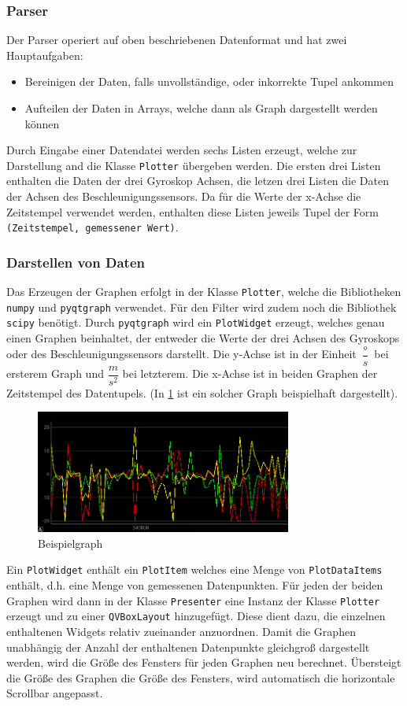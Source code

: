 \subsubsection{Parser}
Der Parser operiert auf oben beschriebenen Datenformat und hat zwei Hauptaufgaben:
\begin{itemize}
 \item Bereinigen der Daten, falls unvollständige, oder inkorrekte Tupel ankommen
 \item Aufteilen der Daten in Arrays, welche dann als Graph dargestellt werden können
\end{itemize}
Durch Eingabe einer Datendatei werden sechs Listen erzeugt, welche zur Darstellung and die Klasse \texttt{Plotter} übergeben werden. Die ersten drei Listen enthalten die Daten der drei Gyroskop Achsen, die letzen drei Listen die Daten der Achsen des Beschleunigungssensors. Da für die Werte der x-Achse die Zeitstempel verwendet werden, enthalten diese Listen jeweils Tupel der Form \texttt{(Zeitstempel, gemessener Wert)}.
\subsubsection{Darstellen von Daten}
Das Erzeugen der Graphen erfolgt in der Klasse \texttt{Plotter}, welche die Bibliotheken \texttt{numpy} und \texttt{pyqtgraph} verwendet. Für den Filter wird zudem noch die Bibliothek \texttt{scipy} benötigt. Durch \texttt{pyqtgraph} wird ein \texttt{PlotWidget} erzeugt, welches genau einen Graphen beinhaltet, der entweder die Werte der drei Achsen des Gyroskops oder des Beschleunigungssensors darstellt. Die y-Achse ist in der Einheit $\dfrac{\circ}{s}$ bei ersterem Graph und $\dfrac{m}{s^{2}}$ bei letzterem. Die x-Achse ist in beiden Graphen der Zeitstempel des Datentupels. (In \ref{fig:k3_4-graph.png} ist ein solcher Graph beispielhaft dargestellt).
\begin{figure}[h]
	\centering
	\includegraphics[width=0.75\textwidth]{images/k3-graph.png}
	\caption {Beispielgraph}
	\label{fig:k3_4-graph.png} 
\end{figure}
Ein \texttt{PlotWidget} enthält ein \texttt{PlotItem} welches eine Menge von \texttt{PlotDataItems} enthält, d.h. eine Menge von gemessenen Datenpunkten.
Für jeden der beiden Graphen wird dann in der Klasse \texttt{Presenter} eine Instanz der Klasse \texttt{Plotter} erzeugt und zu einer \texttt{QVBoxLayout} hinzugefügt. Diese dient dazu, die einzelnen enthaltenen Widgets relativ zueinander anzuordnen.
Damit die Graphen unabhängig der Anzahl der enthaltenen Datenpunkte gleichgroß dargestellt werden, wird die Größe des Fensters für jeden Graphen neu berechnet. Übersteigt die Größe des Graphen die Größe des Fensters, wird automatisch die horizontale Scrollbar angepasst.

